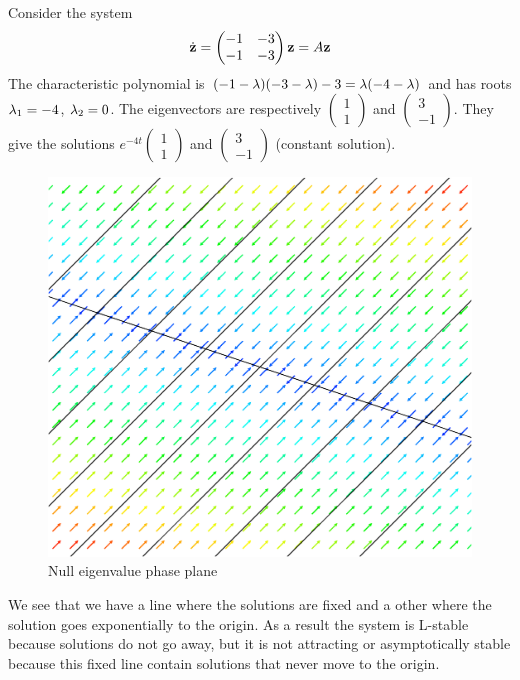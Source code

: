 \begin{exemple}
Consider the system
$$ \dot{\mathbf{z}}=
\begin{pmatrix} -1&-3\\-1&-3 \end{pmatrix}\mathbf{z} =A\mathbf{z}
$$
The characteristic polynomial is $(-1-\lambda)(-3-\lambda)-3=\lambda(-4-\lambda)$ and has roots $\lambda_1=-4$, $\lambda_2=0$. The eigenvectors are respectively $\begin{pmatrix}1\\1\end{pmatrix}$ and 
$\begin{pmatrix}3\\-1\end{pmatrix}$. They give the solutions $e^{-4t}\begin{pmatrix}1\\1\end{pmatrix}$ and $\begin{pmatrix}3\\-1\end{pmatrix}$ (constant solution).
\begin{figure}[H]
    \centering
    \includegraphics[scale=0.3]{images/null_eigenvalue.eps}
    \caption{Null eigenvalue phase plane}
    \label{fig:null_eigenvalue}
\end{figure}
We see that we have a line where the solutions are fixed and a other where the solution goes exponentially to the origin. As a result the system is L-stable because solutions do not go away, but it is not attracting or asymptotically stable because this fixed line contain solutions that never move to the origin.
\end{exemple}
